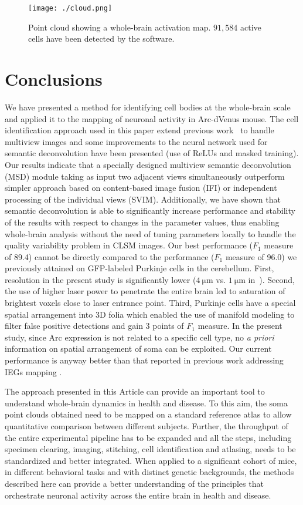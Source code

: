 \documentclass[smallextended]{svjour3}       %
\begin{document}
\begin{figure*}
  \centering
  \texttt{[image: ./cloud.png]}
  \caption{Point cloud showing a whole-brain activation map. $91,584$
    active cells have been detected by the software.}
  \label{fig:cloud}
\end{figure*}


\section{Conclusions}
We have presented a method for identifying cell bodies at the
whole-brain scale and applied it to the mapping of neuronal activity
in Arc-dVenus mouse. The cell identification approach used in this
paper extend previous work~\cite{frasconi_large-scale_2014} to handle
multiview images and some improvements to the neural network used for
semantic deconvolution have been presented (use of ReLUs and
masked training). Our results indicate that a specially designed multiview
semantic deconvolution (MSD) module taking as input two adjacent views
simultaneously outperform simpler approach based on content-based
image fusion (IFI) or independent processing of the individual views
(SVIM). Additionally, we have shown that semantic deconvolution is
able to significantly increase performance and stability of the
results with respect to changes in the parameter values, thus enabling
whole-brain analysis without the need of tuning parameters locally to
handle the quality variability problem in CLSM images. Our best
performance ($F_1$ measure of 89.4) cannot be directly compared to the
performance ($F_1$ measure of 96.0) we previously attained on
GFP-labeled Purkinje cells in the cerebellum. First, resolution in the
present study is significantly lower ($\SI{4}{\micro\meter}$
vs. $\SI{1}{\micro\meter}$
in~\cite{frasconi_large-scale_2014}). Second, the use of higher laser power
to penetrate the entire brain led to saturation of brightest voxels close to laser
entrance point.
Third, Purkinje cells have a special spatial arrangement
into 3D folia which enabled the use of manifold modeling to filter
false positive detections and gain 3 points of $F_1$ measure. In the present study,
since Arc expression is not related to a specific cell type, no \emph{a priori}
information on spatial arrangement of soma can be exploited. Our current performance
is anyway better than that reported in previous work addressing IEGs mapping \cite{kim_mapping_2015}.

The approach presented in this Article can provide an important tool to
understand whole-brain dynamics in health and disease. To this aim, the soma
point clouds obtained need to be mapped on a standard reference atlas
to allow quantitative comparison between different subjects. Further, the throughput of the entire
experimental pipeline has to be expanded and all the steps, including specimen clearing, imaging, stitching, cell identification
and atlasing, needs to be standardized and better integrated.
When applied to a significant cohort of mice, in different behavioral tasks and with
distinct genetic backgrounds, the methods described here can provide a better understanding
of the principles that orchestrate
neuronal activity across the entire brain in health and disease.
\end{document}
